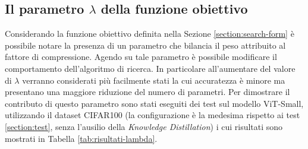 \subsection{Il parametro $\lambda$ della funzione obiettivo}
Considerando la funzione obiettivo definita nella Sezione
\ref{section:search-form} è possibile notare la presenza di un parametro che
bilancia il peso attribuito al fattore di compressione. Agendo su tale
parametro è possibile modificare il comportamento dell'algoritmo di ricerca. In
particolare all'aumentare del valore di $\lambda$ verranno considerati più
facilmente stati la cui accuratezza è minore ma presentano una maggiore
riduzione del numero di parametri. Per dimostrare il contributo di questo
parametro sono stati eseguiti dei test sul modello ViT-Small, utilizzando il
dataset CIFAR100 (la configurazione è la medesima rispetto ai test
\ref{section:test}, senza l'ausilio della \textit{Knowledge Distillation}) i
cui risultati sono mostrati in Tabella \ref{tab:risultati-lambda}.

